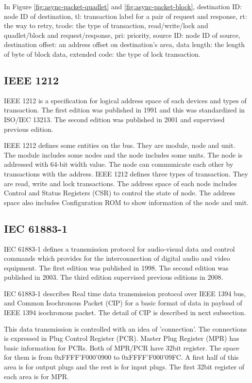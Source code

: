 \documentclass[onecolumn]{article}
\begin{document}
In Figure \ref{fig:async-packet-quadlet} and \ref{fig:async-packet-block}, destination ID: node ID of destination, tl: transaction label for a pair of request and response, rt: the way to retry, tcode: the type of transaction, read/write/lock and quadlet/block and request/response, pri: priority, source ID: node ID of source, destination offset: an address offset on destination's area, data length: the length of byte of block data, extended code: the type of lock transaction.

\subsection{IEEE 1212}

IEEE 1212 is a specification for logical address space of each devices and types of transaction. The first edition was published in 1991\cite{ieee1212-1} and this was standardized in ISO/IEC 13213\cite{iso13213}. The second edition was published in 2001\cite{ieee1212-2} and supervised previous edition.

IEEE 1212 defines some entities on the bus. They are module, node and unit. The module includes some nodes and the node includes some units. The node is addressed with 64-bit width value. The node can communicate each other by transactions with the address. IEEE 1212 defines three types of transaction. They are read, write and lock transactions. The address space of each node includes Control and Status Registers (CSR) to control the state of node. The address space also includes Configuration ROM to show information of the node and unit.


\subsection{IEC 61883-1}

IEC 61883-1 defines a transmission protocol for audio-visual data and control commands which provides for the interconnection of digital audio and video equipment. The first edition was published in 1998\cite{iec61883-1-1}. The second edition was published in 2003\cite{iec61883-1-2}. The third edition supervised previous editions in 2008\cite{iec61883-1-3}.

IEC 61883-1 describes Real time data transmission protocol over IEEE 1394 bus, and Common Isochronous Packet (CIP) for a basic format of data in payload of IEEE 1394 isochronous packet. The detail of CIP is described in next subsection.

This data transmission is controlled with an idea of 'connection'. The connections is expressed in Plug Control Register (PCR). Master Plug Register (MPR) has basic information for PCRs. Both of MPR/PCR have 32bit register. The space for them is from 0xFFFF'F000'0900 to 0xFFFF'F000'09FC. A first half of this area is for output plugs and the rest is for input plugs. The first 32bit register of each area is for MPR.
\end{document}
